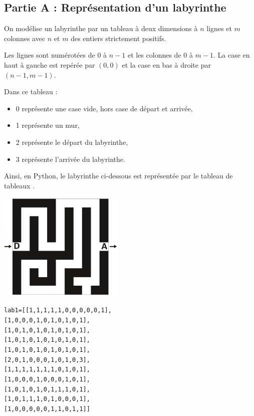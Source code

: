 \documentclass[11pt,a4paper,french,twoside]{PMCours}
\begin{document}
\subsection*{Partie A : Représentation d'un labyrinthe}
On modélise un labyrinthe par un tableau à deux dimensions à $n$ lignes et $m$ colonnes avec $n$ et
$m$ des entiers strictement positifs.

Les lignes sont numérotées de $0$ à $n-1$ et les colonnes de $0$ à $m-1$.
La case en haut à gauche est repérée par $(0,0)$ et la case en bas à droite par $(n-1,m-1)$.

Dans ce tableau :
\begin{itemize}
\item 0 représente une case vide, hors case de départ et arrivée,
\item 1 représente un mur,
\item 2 représente le départ du labyrinthe,
\item 3 représente l'arrivée du labyrinthe.
\end{itemize}
Ainsi, en Python, le labyrinthe ci-dessous est représentée par le tableau de tableaux .

\begin{multicols}{2}
\includegraphics[width=6cm]{BacBlanc2Sujet1_NSI2122-img1.png}

\begin{alltt}
lab1 = [[1, 1, 1, 1, 1, 0, 0, 0, 0, 0, 1],
        [1, 0, 0, 0, 1, 0, 1, 0, 1, 0, 1],
        [1, 0, 1, 0, 1, 0, 1, 0, 1, 0, 1],
        [1, 0, 1, 0, 1, 0, 1, 0, 1, 0, 1],
        [1, 0, 1, 0, 1, 0, 1, 0, 1, 0, 1],
        [2, 0, 1, 0, 0, 0, 1, 0, 1, 0, 3],
        [1, 1, 1, 1, 1, 1, 1, 0, 1, 0, 1],
        [1, 0, 0, 0, 1, 0, 0, 0, 1, 0, 1],
        [1, 0, 1, 0, 1, 0, 1, 1, 1, 0, 1],
        [1, 0, 1, 1, 1, 0, 1, 0, 0, 0, 1],
        [1, 0, 0, 0, 0, 0, 1, 1, 0, 1, 1]]
\end{alltt}
\end{multicols}
\end{document}
